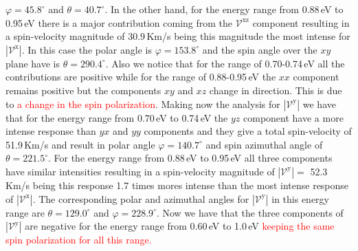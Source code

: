 \documentclass[prb,11pt,tightenlines,twocolumn,aps]{revtex4-1}
\begin{document}
$\varphi = 45.8^{\circ}$ and $\theta=40.7^{\circ}$.
%
In the other hand, for the energy range from 0.88\,eV to 0.95\,eV there is a
major contribution coming from the $\mathcal{V}^{\mathrm{xz}}$ component
resulting in a spin-velocity magnitude of 30.9\,Km/s being this magnitude the
most intense for $|\mathcal{V}^{\mathrm{x}}|$. In this case the polar angle is
$\varphi=153.8^{\circ}$ and the spin angle over the $xy$ plane have is $\theta=290.4^{\circ}$.
%
Also we notice that for the range of 0.70-0.74\,eV all the contributions are
positive while for the range of 0.88-0.95\,eV the $xx$ component remains
positive but the components $xy$ and $xz$ change in direction. This is due to
\textcolor{red}{\large a change in the spin polarization}.
Making now the analysis for $|\mathcal{V}^{\mathrm{y}}|$ we have that for the
energy range from 0.70\,eV to 0.74\,eV the $yz$ component have a more intense
response than $yx$ and $yy$ components and they give a total spin-velocity of
51.9\,Km/s and result in polar angle $\varphi=140.7^{\circ}$ and spin azimuthal
angle of $\theta=221.5^{\circ}$.
%
For the energy range from 0.88\,eV to 0.95\,eV all three components have similar
intensities resulting in a spin-velocity magnitude of
$|\mathcal{V}^{\mathrm{y}}| =$ 52.3\,Km/s being this response 1.7 times mores
intense than the most intense response of $|\mathcal{V}^{\mathrm{x}}|$. The
corresponding polar and azimuthal angles for $|\mathcal{V}^{\mathrm{y}}|$ in
this energy range are $\theta = 129.0 ^{\circ}$ and $\varphi = 228.9 ^{\circ}$.
%
Now we have that the three components of $|\mathcal{V}^{\mathrm{y}}|$ are
negative for the energy range from 0.60\,eV to 1.0\,eV \textcolor{red}{keeping
the same spin polarization for all this range.}




\end{document}
